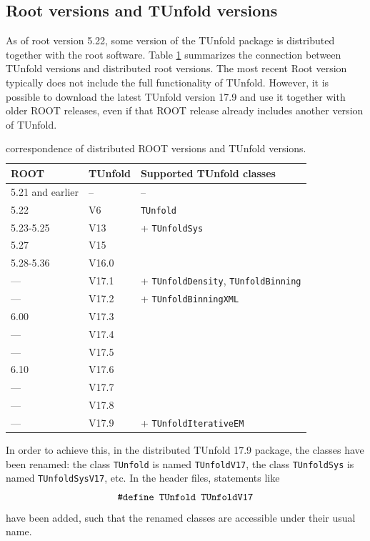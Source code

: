 \documentclass[12pt]{article}
\newcommand{\tunfoldmajor}{17}
\newcommand{\tunfoldminor}{9}
\newcommand{\tunfoldversion}{{\tunfoldmajor{}.\tunfoldminor}}
\begin{document}
\subsection{Root versions and TUnfold versions}

As of root version 5.22, some version of the TUnfold package is
distributed together with the root software. Table
\ref{tab:rootversion} summarizes the connection between TUnfold
versions and distributed root versions.
The most recent Root version typically does not include the full
functionality of TUnfold.
However, it is possible to download the latest TUnfold version
\tunfoldversion{} and use
it together with older ROOT releases, even if that ROOT release
already includes another version of TUnfold.
\begin{table}[h]
\centering
\begin{tabular}{l|l|l}
ROOT & TUnfold & Supported TUnfold classes \\
\hline
5.21 and earlier & -- & -- \\
5.22 & V6 & {\tt TUnfold} \\
5.23-5.25 & V13 & + {\tt TUnfoldSys} \\
5.27 & V15 & \\ %
5.28-5.36 & V16.0 & \\%
---  & V17.1 & + {\tt TUnfoldDensity}, {\tt TUnfoldBinning} \\
--- & V17.2 & + {\tt TUnfoldBinningXML}\\
6.00 & V17.3 & \\
--- & V17.4 & \\
--- & V17.5 & \\
6.10 & V17.6 & \\
--- & V17.7 & \\
--- & V17.8 & \\
--- & V17.9 & + {\tt TUnfoldIterativeEM}\\
\hline
\end{tabular}
\caption{\label{tab:rootversion}correspondence of distributed ROOT versions and TUnfold versions.}
\end{table}
In order to achieve this, in the distributed TUnfold \tunfoldversion{}
package, the classes have been renamed: 
the class {\tt TUnfold} is named {\tt TUnfoldV\tunfoldmajor}, the
class {\tt TUnfoldSys} is named {\tt TUnfoldSysV\tunfoldmajor},
etc. In the header files, statements like
%
\begin{equation*}
\text{\tt \#define TUnfold TUnfoldV\tunfoldmajor}
\end{equation*}
%
have been added, such that the renamed classes are accessible under
their usual name.
\end{document}
